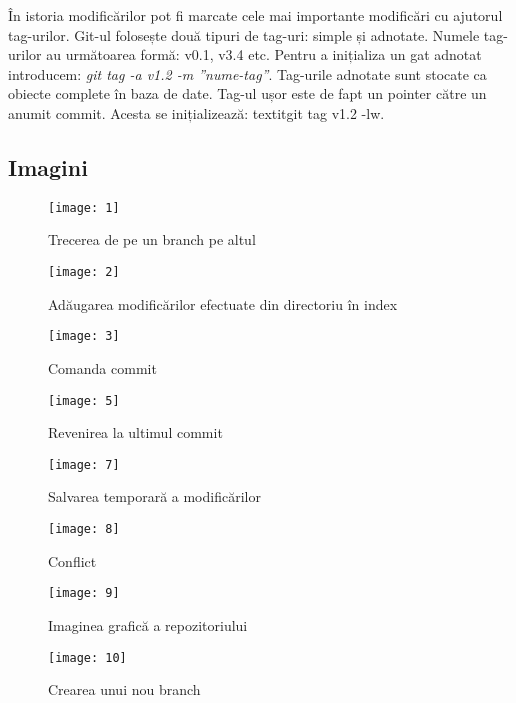 	În istoria modificărilor pot fi marcate cele mai importante modificări cu ajutorul tag-urilor. Git-ul folosește două tipuri de tag-uri: simple și adnotate. Numele tag-urilor au următoarea formă: v0.1, v3.4 etc. Pentru a inițializa un gat adnotat introducem: \textit{git tag -a v1.2 -m ”nume-tag”}. Tag-urile adnotate sunt stocate ca obiecte complete în baza de date. Tag-ul ușor este de fapt un pointer către un anumit commit. Acesta se inițializează: textit{git tag v1.2 -lw}.
	
	
\subsection{Imagini}
\begin{figure}[h]
\texttt{[image: 1]}
\caption{Trecerea de pe un branch pe altul}
\label{fig:1}
\end{figure}

\begin{figure}[h]
\texttt{[image: 2]}
\caption{Adăugarea modificărilor efectuate din directoriu în index}
\label{fig:2}
\end{figure}

\begin{figure}[h]
\texttt{[image: 3]}
\caption{Comanda commit}
\label{fig:3}
\end{figure}

\begin{figure}[h]
\texttt{[image: 5]}
\caption{Revenirea la ultimul commit}
\label{fig:4}
\end{figure}

\begin{figure}[h]
\texttt{[image: 7]}
\caption{Salvarea temporară a modificărilor}
\label{fig:5}
\end{figure}

\begin{figure}[h]
\texttt{[image: 8]}
\caption{Conflict}
\label{fig:6}
\end{figure}

\begin{figure}[h]
\texttt{[image: 9]}
\caption{Imaginea grafică a repozitoriului}
\label{fig:7}
\end{figure}

\begin{figure}[h]
\texttt{[image: 10]}
\caption{Crearea unui nou branch}
\label{fig:8}
\end{figure}

